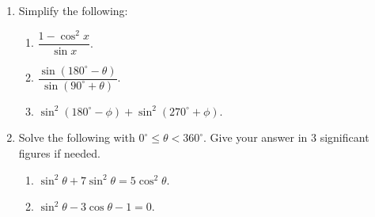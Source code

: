 \documentclass[11pt]{article}
\begin{document}
\begin{enumerate}
            \hrulefill
            
            \hrulefill
            
            \hrulefill
            
            \hrulefill
            
            \hrulefill
            
            \hrulefill

        \pagebreak
        \item Simplify the following:\begin{enumerate}
            \item $\dfrac{1-\cos^2{x}}{\sin{x}}$.
            \item $\dfrac{\sin(180^\circ-\theta)}{\sin(90^\circ+\theta)}$.
            \item $\sin^2(180^\circ-\phi)+\sin^2(270^\circ+\phi)$.
        \end{enumerate}

        \hrulefill

            \hrulefill

            \hrulefill
            
            \hrulefill
            
            \hrulefill
            
            \hrulefill
            
            \hrulefill
            
            \hrulefill
            
            \hrulefill
            
            \hrulefill

        \item Solve the following with $0^\circ\leq \theta< 360^\circ$. Give your answer in 3 significant figures if needed.\begin{enumerate}
            \item $\sin^2{\theta}+7\sin^2{\theta}=5\cos^2{\theta}$.
            \item $\sin^2{\theta}-3\cos{\theta}-1=0$.
        \end{enumerate}

        \hrulefill

        \hrulefill
            
        \hrulefill
        
        \hrulefill
        
        \hrulefill
        

\end{enumerate}
\end{document}
